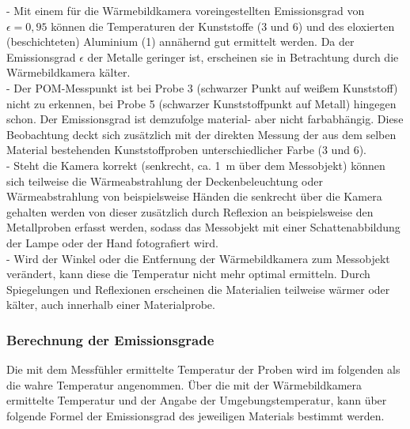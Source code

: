 - Mit einem für die Wärmebildkamera voreingestellten Emissionsgrad von $\epsilon=0,95$ können die Temperaturen der  Kunststoffe (3 und 6) und des eloxierten (beschichteten) Aluminium (1) annähernd gut ermittelt werden. Da der Emissionsgrad $\epsilon$ der Metalle geringer ist, erscheinen sie in Betrachtung durch die  Wärmebildkamera kälter. \\
- Der POM-Messpunkt ist bei Probe 3 (schwarzer Punkt auf weißem Kunststoff) nicht zu erkennen, bei Probe 5 (schwarzer Kunststoffpunkt auf Metall) hingegen schon. Der Emissionsgrad ist demzufolge material- aber nicht farbabhängig. Diese Beobachtung deckt sich zusätzlich mit der direkten Messung der aus dem selben Material bestehenden Kunststoffproben unterschiedlicher Farbe (3 und 6). \\
-  Steht die Kamera korrekt (senkrecht, ca. \SI{1}{m} über dem Messobjekt) können sich teilweise die Wärmeabstrahlung der Deckenbeleuchtung oder Wärmeabstrahlung von beispielsweise Händen die senkrecht über die Kamera gehalten werden von dieser zusätzlich durch Reflexion an beispielsweise den Metallproben erfasst werden, sodass das Messobjekt mit einer Schattenabbildung der Lampe oder der Hand fotografiert wird. \\
- Wird der Winkel oder die Entfernung der Wärmebildkamera zum Messobjekt verändert, kann diese die Temperatur nicht mehr optimal ermitteln. Durch Spiegelungen und Reflexionen erscheinen die Materialien teilweise wärmer oder kälter, auch innerhalb einer Materialprobe. 


\subsubsection{Berechnung der Emissionsgrade}

Die mit dem Messfühler ermittelte Temperatur der Proben wird im folgenden als die wahre Temperatur angenommen. Über die mit der Wärmebildkamera ermittelte Temperatur und der Angabe der Umgebungstemperatur, kann über folgende Formel der Emissionsgrad des jeweiligen Materials bestimmt werden. 

